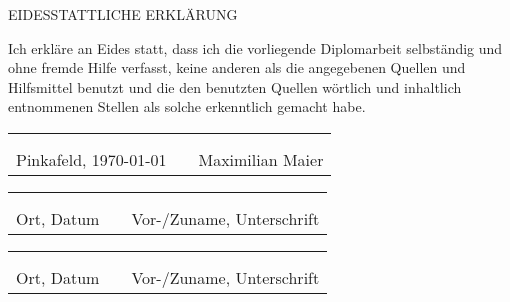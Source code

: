 
\vspace*{2cm}

{EIDESSTATTLICHE ERKLÄRUNG\par}

\vspace*{1cm}

Ich erkläre an Eides statt, dass ich die vorliegende Diplomarbeit selbständig und ohne fremde Hilfe verfasst, keine anderen als die angegebenen Quellen und Hilfsmittel benutzt und die den benutzten Quellen wörtlich und inhaltlich entnommenen Stellen als solche erkenntlich gemacht habe. 





\vspace*{2cm}


\begin{center}
\begin{tabular}{cp{2em}c} 
   \hspace{4cm}        & & \hspace{6cm} \\\cline{1-1}\cline{3-3}
                       & & \\[-3mm]
   {\footnotesize Pinkafeld, \today }  & & {\footnotesize Maximilian Maier }
\end{tabular}

\vspace*{1cm}

\begin{tabular}{cp{2em}c} 
   \hspace{4cm}        & & \hspace{6cm} \\\cline{1-1}\cline{3-3}
                       & & \\[-3mm]
   {\footnotesize Ort, Datum }  & & {\footnotesize Vor-/Zuname, Unterschrift }
\end{tabular}

\vspace*{1cm}

\begin{tabular}{cp{2em}c} 
   \hspace{4cm}        & & \hspace{6cm} \\\cline{1-1}\cline{3-3}
                       & & \\[-3mm]
   {\footnotesize Ort, Datum }  & & {\footnotesize Vor-/Zuname, Unterschrift }
\end{tabular}

\end{center}

\cleardoublepage

